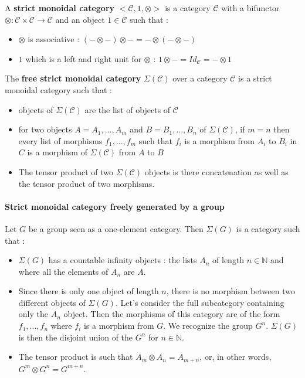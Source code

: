 \documentclass{report}
\begin{document}
\begin{defn}
    A \textbf{strict monoidal category}\cite{lane_1971} $\big<\mathcal{C},1,\otimes\big>$ is a category $\mathcal{C}$ with a bifunctor $\otimes : \mathcal{C}\times\mathcal{C} \rightarrow \mathcal{C}$ and an object $1\in\mathcal{C}$ such that :
    \begin{itemize}
        \item $\otimes$ is associative : $(-\otimes-)\otimes - = - \otimes (-\otimes-)$
        \item $1$ which is a left and right unit for $\otimes$ : $1\otimes - = Id_{\mathcal{C}} = - \otimes 1$
    \end{itemize}
    \label{strict-mon}
\end{defn}


\begin{defn}
    The \textbf{free strict monoidal category} $ \Sigma (\mathcal{C})$ over a category $\mathcal{C}$ is a strict monoidal category such that :
    \begin{itemize}
        \item objects of $\Sigma (\mathcal{C})$ are the list of objects of $\mathcal{C}$
        \item for two objects $A = A_1,\dots,A_m$ and $B = B_1,\dots,B_n$ of $\Sigma (\mathcal{C})$, if $m = n$ then every list of morphisms $f_1,\dots,f_m$ such that $f_i$ is a morphism from $A_i$ to $B_i$ in $C$ is a morphism of $\Sigma(\mathcal{C})$ from $A$ to $B$
        \item The tensor product of two $\Sigma(\mathcal{C})$ objects is there concatenation as well as the tensor product of two morphisms.
    \end{itemize}
\end{defn}

\paragraph{Strict monoidal category freely generated by a group}


Let $G$ be a group seen as a one-element category. Then $ \Sigma(G)$ is a category such that :
\begin{itemize}
    \item $\Sigma(G)$ has a countable infinity objects : the lists $A_n$ of length $n \in \mathbb{N}$ and where all the elements of $A_n$ are $A$.
    \item Since there is only one object of length $n$, there is no morphism between two different objects of $\Sigma(G)$. Let's consider the full subcategory containing only the $A_n$ object. Then the morphisms of this category are of the form $f_1,...,f_n$ where $f_i$ is a morphism from $G$. We recognize the group $G^{n}$. $\Sigma (G)$ is then the disjoint union of the $G^{n}$ for $ n\in\mathbb{N}$.
    \item  The tensor product is such that  $A_m \otimes A_n = A_{m+n}$, or, in other words, $G^m \otimes G^n = G^{m+n}$.
\end{itemize}
\end{document}
